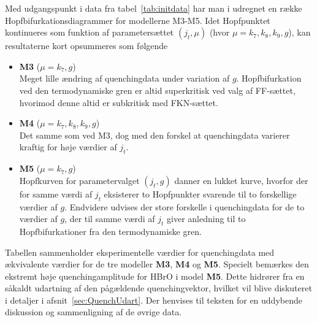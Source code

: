\vspace{4.0mm}
Med udgangspunkt i data fra tabel~\ref{tab:initdata} har
man i \cite{HopfQuench} udregnet en r{\ae}kke
Hopfbifurkationsdiagrammer for model\-lerne M3-M5. Idet
Hopfpunktet kontinueres som funktion af parameters{\ae}ttet
$(j_t,\mu)$ (hvor $\mu = k_7, k_8, k_9, g $), kan
resultaterne kort opsummeres som f{\o}lgende

\begin{itemize}
 \item {\bf M3 }($\mu = k_7, g $)\\
 Meget lille {\ae}ndring af quenchingdata under variation
 af $g$. Hopfbifurkation ved den termodynamiske gren
 er altid superkritisk ved valg af FF-s{\ae}ttet, hvorimod
 denne altid er subkritisk med FKN-s{\ae}ttet.
 \item {\bf M4 }($\mu = k_7, k_8, k_9, g $)\\
 Det samme som ved M3, dog med den forskel at quenchingdata
 varierer kraftig for h{\o}je v{\ae}rdier af $j_t$.
 \item {\bf M5 }($\mu = k_7, g $)\\
 Hopfkurven for parametervalget $(j_t,g)$ danner en lukket
 kurve, hvorfor der for samme v{\ae}rdi af $j_t$ eksisterer
 to Hopfpunkter svarende til to forskellige v{\ae}rdier af
 $g$. Endvidere udvises der store forskelle i quenchingdata
 for de to v{\ae}rdier af $g$, der til samme v{\ae}rdi af
 $j_t$ giver anledning til to Hopfbifurkationer fra den
 termodynamiske gren. 
\end{itemize}

\begin{table}[t]
 \renewcommand{\capfont}{\bf}
 \begin{center}
  
 \end{center}
 \caption{\protect\capsize
  Tabellen sammenholder eksperimentelle v{\ae}rdier for
  quenchingdata med {\ae}kvivalente v{\ae}rdier for de tre
  model\-ler {\bf M3}, {\bf M4} og {\bf M5}. Specielt
  bem{\ae}rkes den ekstremt h{\o}je quenchingamplitude for
  HBrO i model {\bf M5}. Dette hidr{\o}rer fra en
  s{\aa}kaldt udartning af den p{\aa}g{\ae}ldende
  quenchingvektor, hvilket vil blive diskuteret i detaljer
  i afsnit~\protect\ref{sec:QuenchUdart}. Der henvises til
  teksten for en uddybende diskussion og sammenlig\-ning af
  de {\o}vrige data. }
 \label{tab:data}
 \renewcommand{\capfont}{\rm}
\end{table} 

